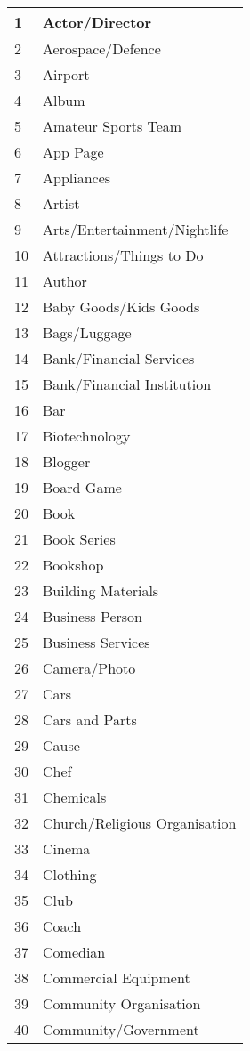 \begin{longtable}{|p{1cm}|p{4in}|}
1&Actor/Director \\ \hline
2&Aerospace/Defence \\ \hline
3&Airport \\ \hline
4&Album \\ \hline
5&Amateur Sports Team \\ \hline
6&App Page \\ \hline
7&Appliances \\ \hline
8&Artist \\ \hline
9&Arts/Entertainment/Nightlife \\ \hline
10&Attractions/Things to Do \\ \hline
11&Author \\ \hline
12&Baby Goods/Kids Goods \\ \hline	
13&Bags/Luggage \\ \hline
14&Bank/Financial Services \\ \hline
15&Bank/Financial Institution \\ \hline
16&Bar \\ \hline
17&Biotechnology \\ \hline
18&Blogger \\ \hline
19&Board Game \\ \hline
20&Book \\ \hline
21&Book Series \\ \hline
22&Bookshop \\ \hline
23&Building Materials \\ \hline	
24&Business Person \\ \hline
25&Business Services \\ \hline
26&Camera/Photo \\ \hline
27&Cars \\ \hline
28&Cars and Parts \\ \hline
29&Cause \\ \hline
30&Chef \\ \hline
31&Chemicals \\ \hline
32&Church/Religious Organisation \\ \hline
33&Cinema \\ \hline
34&Clothing \\ \hline
35&Club \\ \hline
36&Coach \\ \hline
37&Comedian \\ \hline
38&Commercial Equipment \\ \hline
39&Community Organisation \\ \hline
40&Community/Government \\ \hline

\end{longtable}
